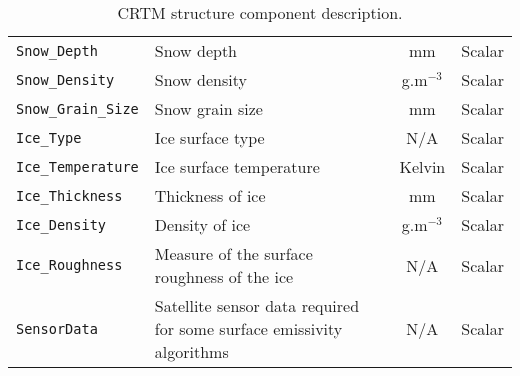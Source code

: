 \begin{table}[htp]
\begin{tabular}{l p{7cm} c c}
    \texttt{Snow\_Depth}       & Snow depth & mm & Scalar \\ 
    \texttt{Snow\_Density}     & Snow density & g.m$^{-3}$ & Scalar \\ 
    \texttt{Snow\_Grain\_Size} & Snow grain size & mm & Scalar \\ 
    \hline
    \texttt{Ice\_Type}        & Ice surface type & N/A & Scalar \\ 
    \texttt{Ice\_Temperature} & Ice surface temperature & Kelvin & Scalar \\ 
    \texttt{Ice\_Thickness}   & Thickness of ice & mm & Scalar \\ 
    \texttt{Ice\_Density}     & Density of ice & g.m$^{-3}$ & Scalar \\ 
    \texttt{Ice\_Roughness}   & Measure of the surface roughness of the ice & N/A & Scalar \\ 
    \hline
    \texttt{SensorData} & Satellite sensor data required for some surface emissivity algorithms & N/A & Scalar \\ 
    \hline
  \end{tabular}
  \caption{CRTM \Surface{} structure component description.}
  \label{tav:surface_structure}
\end{table}

